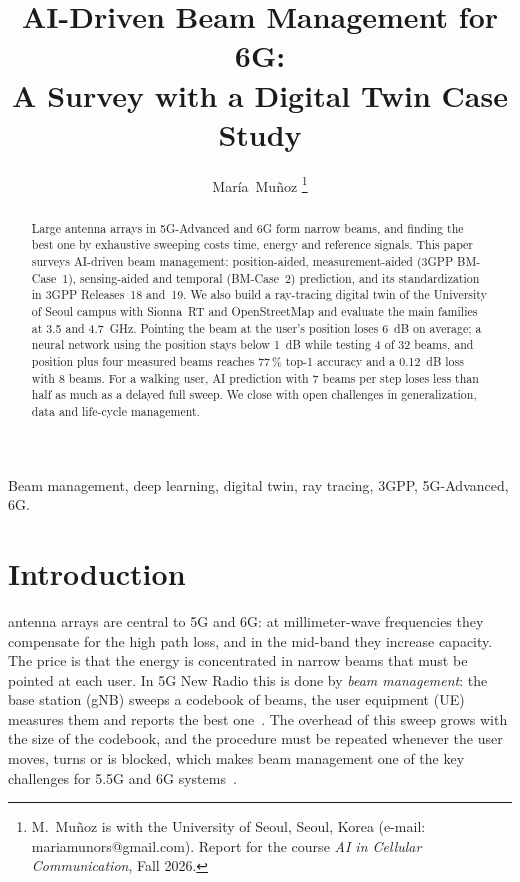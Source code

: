 \documentclass[journal]{IEEEtran}
\begin{document}

\title{AI-Driven Beam Management for 6G:\\ A Survey with a Digital Twin Case Study}

\author{Mar\'ia~Mu\~noz
\thanks{M.~Mu\~noz is with the University of Seoul, Seoul, Korea (e-mail: mariamunors@gmail.com). Report for the course \emph{AI in Cellular Communication}, Fall 2026.}}

\maketitle


\begin{abstract}
Large antenna arrays in 5G-Advanced and 6G form narrow beams, and finding the best one by exhaustive sweeping costs time, energy and reference signals. This paper surveys AI-driven beam management: position-aided, measurement-aided (3GPP BM-Case~1), sensing-aided and temporal (BM-Case~2) prediction, and its standardization in 3GPP Releases~18 and~19. We also build a ray-tracing digital twin of the University of Seoul campus with Sionna~RT and OpenStreetMap and evaluate the main families at 3.5 and 4.7~GHz. Pointing the beam at the user's position loses 6~dB on average; a neural network using the position stays below 1~dB while testing 4 of 32 beams, and position plus four measured beams reaches 77\,\% top-1 accuracy and a 0.12~dB loss with 8 beams. For a walking user, AI prediction with 7 beams per step loses less than half as much as a delayed full sweep. We close with open challenges in generalization, data and life-cycle management.
\end{abstract}

\begin{IEEEkeywords}
Beam management, deep learning, digital twin, ray tracing, 3GPP, 5G-Advanced, 6G.
\end{IEEEkeywords}

\section{Introduction}
 antenna arrays are central to 5G and 6G: at millimeter-wave frequencies they compensate for the high path loss, and in the mid-band they increase capacity. The price is that the energy is concentrated in narrow beams that must be pointed at each user. In 5G New Radio this is done by \emph{beam management}: the base station (gNB) sweeps a codebook of beams, the user equipment (UE) measures them and reports the best one~\cite{giordani2019tutorial}. The overhead of this sweep grows with the size of the codebook, and the procedure must be repeated whenever the user moves, turns or is blocked, which makes beam management one of the key challenges for 5.5G and 6G systems~\cite{heng2021six}.
\end{document}
